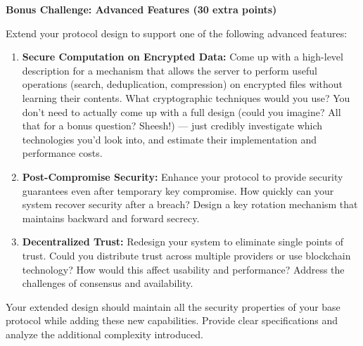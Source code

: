 \documentclass[10pt,a4paper,american]{article}
\begin{document}
\begin{tcolorbox}[colframe=EarthBrown!30!white,colback=EarthBrown!5!white]
	\textbf{Bonus Challenge: Advanced Features (30 extra points)}

	Extend your protocol design to support one of the following advanced features:

	\begin{enumerate}
		\item \textbf{Secure Computation on Encrypted Data:} Come up with a high-level description for a mechanism that allows the server to perform useful operations (search, deduplication, compression) on encrypted files without learning their contents. What cryptographic techniques would you use? You don't need to actually come up with a full design (could you imagine? All that for a bonus question? Sheesh!) — just credibly investigate which technologies you'd look into, and estimate their implementation and performance costs.

		\item \textbf{Post-Compromise Security:} Enhance your protocol to provide security guarantees even after temporary key compromise. How quickly can your system recover security after a breach? Design a key rotation mechanism that maintains backward and forward secrecy.

		\item \textbf{Decentralized Trust:} Redesign your system to eliminate single points of trust. Could you distribute trust across multiple providers or use blockchain technology? How would this affect usability and performance? Address the challenges of consensus and availability.
	\end{enumerate}

	Your extended design should maintain all the security properties of your base protocol while adding these new capabilities. Provide clear specifications and analyze the additional complexity introduced.
\end{tcolorbox}
\end{document}
